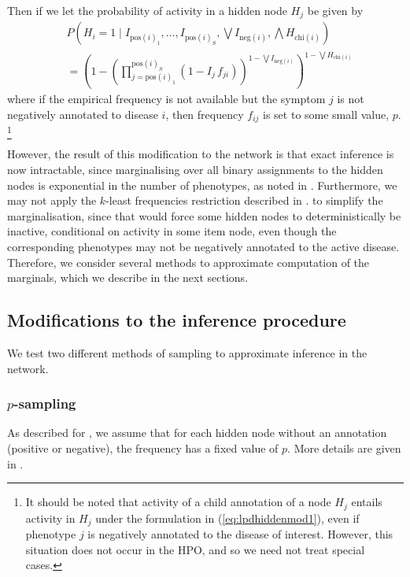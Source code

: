 Then if we let the probability of activity in a hidden node $H_j$ be given by
\begin{align}\label{eq:lpdhiddenmod1}
    &P\left(H_i = 1 \mid I_{\text{pos}(i)_1}, \hdots, I_{\text{pos}(i)_S},
    \bigvee I_{\text{neg}(i)}, \bigwedge H_{\text{chi}(i)}\right)\nonumber\\
        &= \left(
            1 - 
            \left(
                \prod_{j=\text{pos}(i)_1}^{\text{pos}(i)_S}
                \left(1 - I_j \, f_{ji}\right)
            \right) ^{1 - \bigvee I_{\text{neg}(i)}}
        \right)
        ^{1 - \bigvee H_{\text{chi}(i)}}
\end{align}
where if the empirical frequency is not available but the symptom $j$ is not
negatively annotated to disease $i$, then frequency $f_{ij}$ is set to some
small value, $p$.
%
\footnote{It should be noted that activity of a child annotation of a node
    $H_j$ entails activity in $H_j$ under the formulation in
    (\ref{eq:lpdhiddenmod1}), even if phenotype $j$ is negatively annotated
    to the disease of interest. However, this situation does not occur in the
    HPO, and so we need not treat special cases.
}

However, the result of this modification to the network is that exact inference
is now intractable, since marginalising over all binary assignments to the
hidden nodes is exponential in the number of phenotypes,
as noted in . 
%
Furthermore, we may not apply the $k$-least frequencies restriction 
described in . 
to simplify the marginalisation, since that would force some hidden nodes to
deterministically be inactive, conditional on activity in
some item node, even though the corresponding phenotypes may not be negatively
annotated to the active disease.
%
Therefore, we consider several methods to approximate computation of the
marginals, which we describe in the next sections.

\subsection{Modifications to the inference procedure}
\label{subsec:modinf}

We test two different methods of sampling to approximate inference in the
network.

\subsubsection{$p$-sampling}
\label{subsubsec:psampmodel}
%
As described for ,
we assume that for each hidden node without an annotation (positive or negative), the frequency
has a fixed value of $p$. 
%
More details are given in .

